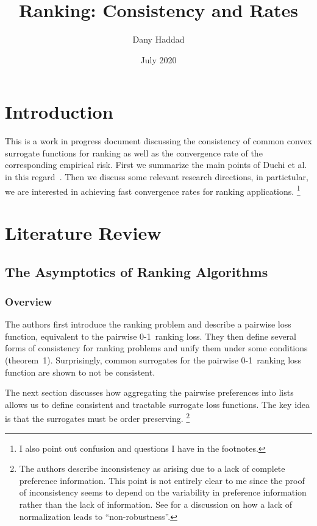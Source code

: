 \documentclass{article}
\begin{document}
\title{Ranking: Consistency and Rates}
\author{Dany Haddad}
\date{July 2020}
\maketitle

\section{Introduction}

This is a work in progress document discussing the consistency of
common convex surrogate functions for ranking as well as the
convergence rate of the corresponding empirical risk. First we
summarize the main points of Duchi et al. in this
regard~\cite{duchi-2010-ranking,duchi-2013-ranking}. Then we discuss
some relevant research directions, in partictular, we are interested
in achieving fast convergence rates for ranking
applications.
\footnote{I also point out confusion and questions I have in the footnotes.}

\section{Literature Review}

\subsection{The Asymptotics of Ranking Algorithms}

\subsubsection{Overview}

The authors first introduce the ranking problem and describe a
pairwise loss function, equivalent to the pairwise 0-1~ranking
loss. They then define several forms of consistency for ranking
problems and unify them under some conditions
(theorem~1). Surprisingly, common surrogates for the pairwise
0-1~ranking loss function are shown to not be consistent.

The next section discusses how aggregating the pairwise preferences
into lists allows us to define consistent and tractable surrogate loss
functions. The key idea is that the surrogates must be order preserving.
\footnote{The authors describe inconsistency as arising due to a lack of complete preference information. This point is not entirely clear to me since the proof of inconsistency seems to depend on the variability in preference information rather than the lack of information. See \cite{ravikumar-2011-ranking} for a discussion on how a lack of normalization leads to ``non-robustness''.}
\end{document}
